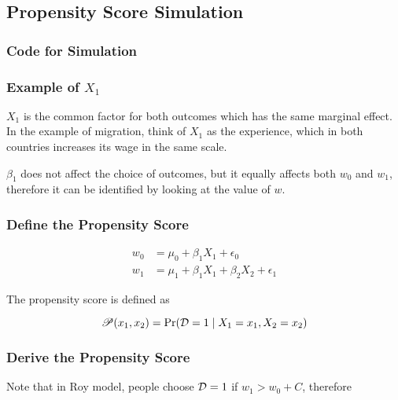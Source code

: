 \subsection{Propensity Score Simulation}

\subsubsection{Code for Simulation}


\subsubsection{Example of $X_1$}

$X_1$ is the common factor for both outcomes which has the same marginal effect. In the example of migration, think of $X_1$ as the experience, which in both countries increases its wage in the same scale.

$\beta_1$ does not affect the choice of outcomes, but it equally affects both $w_0$ and $w_1$, therefore it can be identified by looking at the value of $w$. 


\subsubsection{Define the Propensity Score}

\begin{subequations}
    \begin{align}
        w_0 &= \mu_0 + \beta_1 X_1  + \epsilon_0 \label{eq:w0} \\
        w_1 &= \mu_1 + \beta_1 X_1 + \beta_2 X_2 + \epsilon_1 \label{eq:w1}
    \end{align}
\end{subequations}

The propensity score is defined as

\begin{equation}
    \mathscr{P}(x_1, x_2) = \Pr(\mathcal{D} = 1 \mid X_1=x_1, X_2=x_2) \label{eq:roy_pscore}
\end{equation}


\subsubsection{Derive the Propensity Score}
Note that in Roy model, people choose $\mathcal{D} = 1$ if $w_1 > w_0 + C$, therefore

